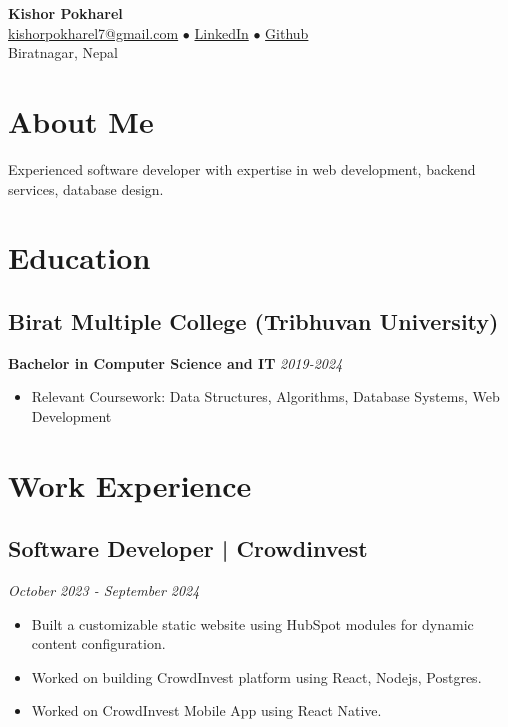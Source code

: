 \documentclass[11pt,a4paper]{article}
\begin{document}
\begin{center}
    {\LARGE \textbf{Kishor Pokharel}}\\
    \vspace{0.25em}
    \href{mailto:kishorpokharel7@gmail.com}{kishorpokharel7@gmail.com} $\bullet$
    \href{https://www.linkedin.com/in/kishor-pokharel-7192951b0}{LinkedIn} $\bullet$
    \href{https://github.com/KishorPokharel}{Github}\\
    Biratnagar, Nepal
\end{center}


\section*{About Me}
Experienced software developer with expertise in web development, backend services, database design.

\section*{Education}
\subsection*{Birat Multiple College (Tribhuvan University)}
\textbf{Bachelor in Computer Science and IT} \hfill \textit{2019-2024}
\begin{itemize}[leftmargin=*, noitemsep]
    \item Relevant Coursework: Data Structures, Algorithms, Database Systems, Web Development
\end{itemize}

\section*{Work Experience}

\subsection*{Software Developer | Crowdinvest} \hfill \textit{October 2023 - September 2024}
\begin{itemize}[leftmargin=*, noitemsep]
    \item Built a customizable static website using HubSpot modules for dynamic content configuration.
    \item Worked on building CrowdInvest platform using React, Nodejs, Postgres.
    \item Worked on CrowdInvest Mobile App using React Native.
\end{itemize}
\end{document}
